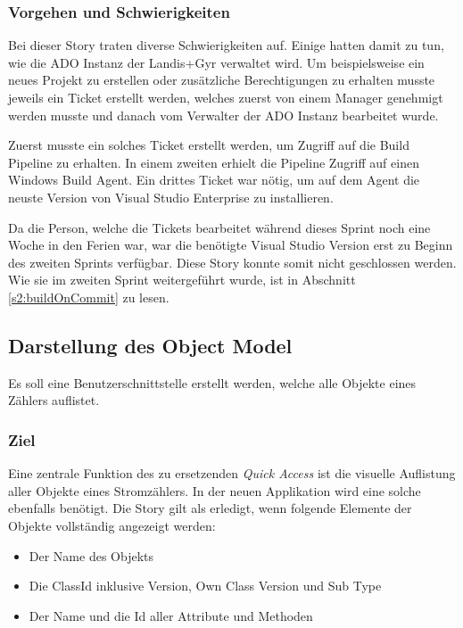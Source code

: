 \subsubsection{Vorgehen und Schwierigkeiten}
Bei dieser Story traten diverse Schwierigkeiten auf.
Einige hatten damit zu tun, wie die \ac{ADO} Instanz der Landis+Gyr verwaltet wird.
Um beispielsweise ein neues Projekt zu erstellen oder zusätzliche Berechtigungen zu erhalten musste jeweils ein Ticket erstellt werden, welches zuerst von einem Manager genehmigt werden musste und danach vom Verwalter der \ac{ADO} Instanz bearbeitet wurde.

Zuerst musste ein solches Ticket erstellt werden, um Zugriff auf die Build Pipeline zu erhalten.
In einem zweiten erhielt die Pipeline Zugriff auf einen Windows Build Agent.
Ein drittes Ticket war nötig, um auf dem Agent die neuste Version von Visual Studio Enterprise zu installieren.

Da die Person, welche die Tickets bearbeitet während dieses Sprint noch eine Woche in den Ferien war, war die benötigte Visual Studio Version erst zu Beginn des zweiten Sprints verfügbar.
Diese Story konnte somit nicht geschlossen werden.
Wie sie im zweiten Sprint weitergeführt wurde, ist in Abschnitt \ref{s2:buildOnCommit} zu lesen.


\subsection{Darstellung des Object Model}\label{visualizeOM}
\dq Es soll eine Benutzerschnittstelle erstellt werden, welche alle Objekte eines Zählers auflistet.\dq

\subsubsection{Ziel}
Eine zentrale Funktion des zu ersetzenden \textit{Quick Access} ist die visuelle Auflistung aller Objekte eines Stromzählers.
In der neuen Applikation wird eine solche ebenfalls benötigt.
Die Story gilt als erledigt, wenn folgende Elemente der Objekte vollständig angezeigt werden:
\begin{itemize}
   \item Der Name des Objekts
   \item Die ClassId inklusive Version, Own Class Version und Sub Type
   \item Der Name und die Id aller Attribute und Methoden
\end{itemize}

